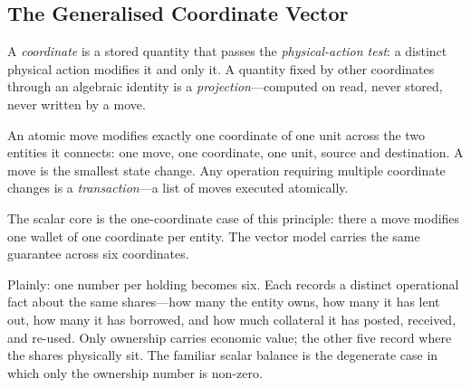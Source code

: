\subsection{The Generalised Coordinate Vector}
\label{sec:position-vector}

A \emph{coordinate} is a stored quantity that passes the \emph{physical-action test}: a distinct physical action modifies it and only it. A quantity fixed by other coordinates through an algebraic identity is a \emph{projection}---computed on read, never stored, never written by a move.

\begin{principle}
\label{princ:single-coord}
An atomic move modifies exactly one coordinate of one unit across the two entities it connects: one move, one coordinate, one unit, source and destination. A move is the smallest state change. Any operation requiring multiple coordinate changes is a \emph{transaction}---a list of moves executed atomically.
\end{principle}

The scalar core is the one-coordinate case of this principle: there a move modifies one wallet of one coordinate per entity. The vector model carries the same guarantee across six coordinates.

Plainly: one number per holding becomes six. Each records a distinct operational fact about the same shares---how many the entity owns, how many it has lent out, how many it has borrowed, and how much collateral it has posted, received, and re-used. Only ownership carries economic value; the other five record where the shares physically sit. The familiar scalar balance is the degenerate case in which only the ownership number is non-zero.

